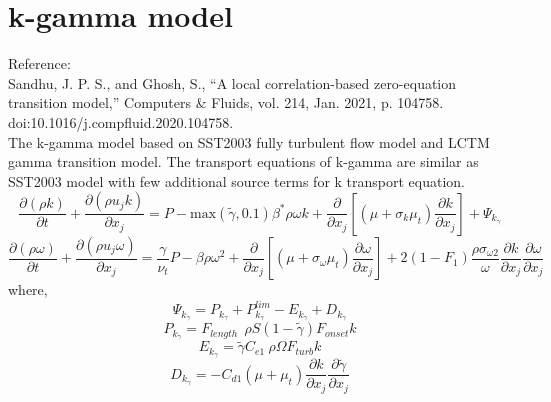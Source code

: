 

%
\section{k-gamma model}
Reference:\\
Sandhu, J. P. S., and Ghosh, S., “A local correlation-based zero-equation transition model,” Computers & Fluids, vol. 214, Jan. 2021, p. 104758. doi:10.1016/j.compfluid.2020.104758.\\
The k-gamma model based on SST2003 fully turbulent flow model and LCTM  gamma transition model.
The transport equations of k-gamma are similar as SST2003 model with few additional source terms for k transport equation.
\begin{equation}
  \frac{\partial(\rho k)}{\partial t}+\frac{\partial\left(\rho u_{j} k\right)}{\partial x_{j}}=P-\text{max}(\widetilde{\gamma},0.1)\beta^{*} \rho \omega k+\frac{\partial}{\partial x_{j}}\left[\left(\mu+\sigma_{k} \mu_{t}\right) \frac{\partial k}{\partial x_{j}}\right] + \Psi_{k_\gamma}
\end{equation}
\begin{equation}
\frac{\partial(\rho \omega)}{\partial t}+\frac{\partial\left(\rho u_{j} \omega\right)}{\partial x_{j}}=\frac{\gamma}{\nu_{t}} P-\beta \rho \omega^{2}+\frac{\partial}{\partial x_{j}}\left[\left(\mu+\sigma_{\omega} \mu_{t}\right) \frac{\partial \omega}{\partial x_{j}}\right]+2\left(1-F_{1}\right) \frac{\rho \sigma_{\omega 2}}{\omega} \frac{\partial k}{\partial x_{j}} \frac{\partial \omega}{\partial x_{j}}
\end{equation}
where,
\begin{equation}
  \Psi_{k_\gamma} = P_{k_\gamma}+P_{k_\gamma}^{lim}- E_{k_\gamma}+ D_{k_\gamma}
\end{equation}
\begin{equation}
  P_{k_\gamma} = F_{length} \phantom{I} \rho S (1-\widetilde{\gamma})F_{onset} k
\end{equation}
\begin{equation}
  E_{k_\gamma} = \widetilde{\gamma} C_{e1}\ \rho\Omega F_{turb} k
\end{equation}
\begin{equation}
  D_{k_\gamma} = -C_{d1}(\mu + \mu_t)\frac{\partial k}{\partial x_j}\frac{\partial \widetilde{\gamma}}{\partial x_j}
\end{equation}
